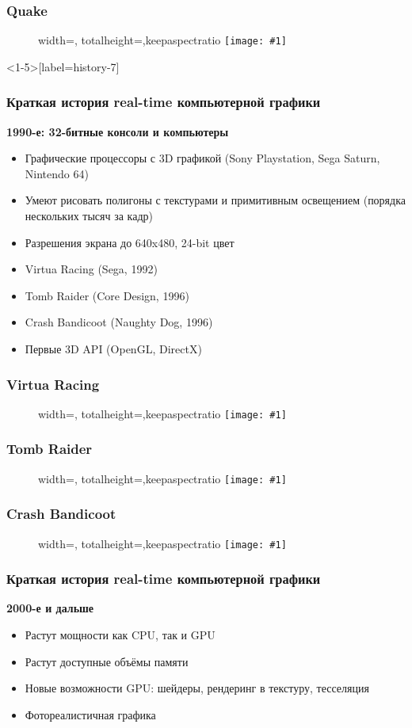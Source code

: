 \documentclass[10pt]{beamer}
\newcommand{\slideimage}[1]{
  \begin{figure}
    \begin{adjustbox}{width=\textwidth, totalheight=\textheight-2\baselineskip-2\baselineskip,keepaspectratio}
      \texttt{[image: \#1]}
    \end{adjustbox}
  \end{figure}
}
\begin{document}
\begin{frame}
\frametitle{Quake}
\slideimage{quake.png}
\end{frame}

\begin{frame}<1-5>[label=history-7]
\frametitle{Краткая история real-time компьютерной графики}
\textbf{1990-е: 32-битные консоли и компьютеры}
\pause
\begin{itemize}
\item Графические процессоры с 3D графикой (Sony Playstation, Sega Saturn, Nintendo 64)
\pause
\item Умеют рисовать полигоны с текстурами и примитивным освещением (порядка нескольких тысяч за кадр)
\pause
\item Разрешения экрана до 640x480, 24-bit цвет
\pause
\item Virtua Racing (Sega, 1992)
\pause
\item Tomb Raider (Core Design, 1996)
\pause
\item Crash Bandicoot (Naughty Dog, 1996)
\pause
\item Первые 3D API (OpenGL, DirectX)
\end{itemize}
\end{frame}

\begin{frame}
\frametitle{Virtua Racing}
\slideimage{racing.png}
\end{frame}


\begin{frame}
\frametitle{Tomb Raider}
\slideimage{tomb-raider.png}
\end{frame}


\begin{frame}
\frametitle{Crash Bandicoot}
\slideimage{crash.jpg}
\end{frame}

\begin{frame}
\frametitle{Краткая история real-time компьютерной графики}
\textbf{2000-е и дальше}
\pause
\begin{itemize}
\item Растут мощности как CPU, так и GPU
\pause
\item Растут доступные объёмы памяти
\pause
\item Новые возможности GPU: шейдеры, рендеринг в текстуру, тесселяция
\pause
\item Фотореалистичная графика
\end{itemize}
\end{frame}
\end{document}
